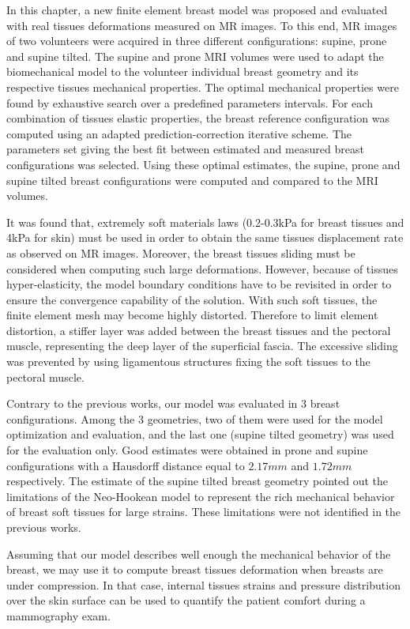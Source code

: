 In this chapter, a new finite element breast model was proposed and  evaluated with real tissues deformations measured on MR images. To this end, MR images of two volunteers were acquired in three different configurations: supine, prone and supine tilted. The supine and prone MRI volumes were used to adapt the biomechanical model to the volunteer individual breast geometry and its respective tissues mechanical properties.  The optimal mechanical properties were found by exhaustive search over a predefined parameters intervals. For each combination of tissues elastic properties,  the breast reference configuration was computed using an adapted prediction-correction iterative scheme. The parameters set giving the best fit between estimated and measured breast configurations was selected.  Using these optimal estimates, the supine, prone and supine tilted breast configurations were computed and compared to the MRI volumes.

It was found that, extremely soft materials laws (0.2-0.3kPa for breast tissues and 4kPa for skin) must be used in order to obtain the same tissues displacement rate as observed on MR images. Moreover, the breast tissues sliding must be considered when computing such large deformations. However, because of tissues hyper-elasticity, the model boundary conditions have to be revisited in order to ensure the convergence capability of the solution. With such soft tissues, the finite element mesh may become highly distorted. Therefore to limit element distortion, a stiffer layer was added between the breast tissues and the pectoral muscle, representing the deep layer of the superficial fascia. The excessive  sliding was prevented by using ligamentous structures fixing the soft tissues to the pectoral muscle.

Contrary to the previous works, our model was evaluated in 3 breast configurations. Among the 3 geometries, two of them were used for the model optimization and evaluation, and the last one (supine tilted geometry) was used for the evaluation only. Good estimates were obtained in prone and supine configurations with a Hausdorff distance equal to $2.17 mm$ and $1.72 mm$ respectively.  The estimate of the supine tilted breast geometry pointed out the limitations of the Neo-Hookean model to represent the rich mechanical behavior of breast soft tissues for large strains. These limitations were not identified in the previous works. 

Assuming that our model describes well enough the mechanical behavior of the breast, we may use it to compute breast tissues deformation when breasts are under compression. In that case, internal tissues strains and pressure distribution over the skin surface can be used to quantify the patient comfort during a mammography exam. 
   